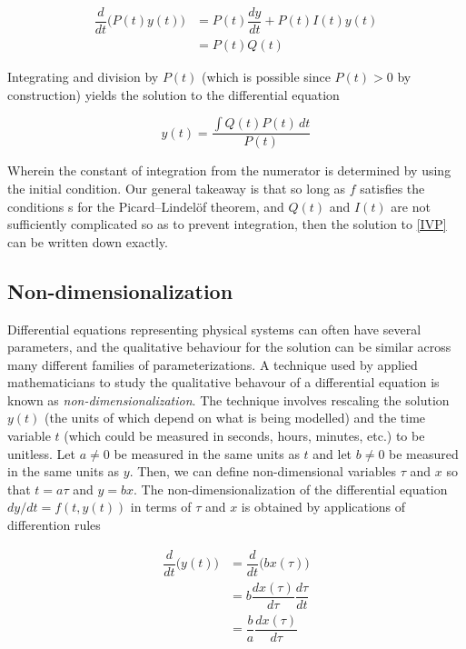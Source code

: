 \begin{align}
 \dfrac{d}{dt} \Big( P(t)y(t) \Big) &= P(t)\dfrac{dy}{dt} + P(t)I(t)y(t) \\
														  &= P(t) Q(t)
\end{align}

\noindent Integrating and division by $P(t)$ (which is possible since $P(t)>0$ by construction) yields the solution to the differential equation

\begin{equation}
	y(t) = \dfrac{\int Q(t) P(t)\, dt}{P(t)}
\end{equation}

\noindent Wherein the constant of integration from the numerator is determined by using the initial condition. Our general takeaway is that so long as $f$ satisfies the conditions s for the Picard–Lindelöf theorem, and $Q(t)$ and $I(t)$ are not sufficiently complicated so as to prevent integration, then the solution to \cref{IVP} can be written down exactly.


\subsection{Non-dimensionalization}

Differential equations representing physical systems can often have several parameters, and the qualitative behaviour for the solution can be similar across many different families of parameterizations. A technique used by applied mathematicians to study the qualitative behavour of a differential equation is known as \textit{non-dimensionalization}.  The technique involves rescaling the solution $y(t)$ (the units of which depend on what is being modelled) and the time variable $t$ (which could be measured in seconds, hours, minutes, etc.) to be unitless. Let $a \neq 0$ be measured in the same units as $t$ and let $b \neq 0$ be measured in the same units as $y$.  Then, we can define non-dimensional variables $\tau$ and $x$ so that $t = a \tau $ and $y = b x$.  The non-dimensionalization of the differential equation $dy/dt = f(t, y(t))$  in terms of $\tau$ and $x$ is obtained by applications of differention rules

\begin{align}
	\dfrac{d }{dt} \Big( y(t) \Big) &=  	\dfrac{d }{dt} \Big( b x(\tau) \Big)\\
													&= b \dfrac{dx(\tau) }{d\tau} \dfrac{d \tau}{dt}\\
													&= \dfrac{b}{a} \dfrac{dx(\tau)}{d\tau}
\end{align}


